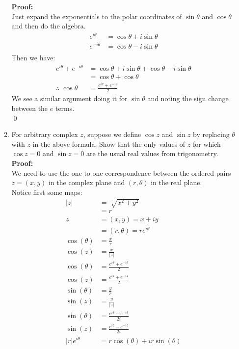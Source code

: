 \begin{enumerate}
\begin{enumerate}
		\textbf{Proof:} \\
		Just expand the exponentials to the polar coordinates of $\sin\theta$ and $\cos\theta$ and then do the algebra. \\
		\begin{align*}
			e^{i\theta} &= \cos\theta + i\sin\theta \\
			e^{-i\theta} &= \cos\theta - i\sin\theta \\
		\end{align*}
		Then we have:
		\begin{align*}
			e^{i\theta} + e^{-i\theta} &= \cos\theta + i\sin\theta + \cos\theta - i\sin\theta \\
			&= \cos\theta + \cos\theta \\
			\therefore \; \cos\theta &=  \frac{e^{i\theta} + e^{-i\theta}}{2}
		\end{align*}
		We see a similar argument doing it for $\sin\theta$ and noting the sign change between the $e$ terms. \\
		\qed
	

		\item For arbitrary complex $z$, suppose we define $\cos{z}$ and $\sin{z}$ by replacing $\theta$ with $z$ in the above formula. 
		Show that the only values of $z$ for which $\cos{z} = 0$ and $\sin{z} = 0$ are the usual real values from trigonometry. \\
		
		\textbf{Proof:} \\
		We need to use the one-to-one correspondence between the ordered pairs $z = (x, y)$ in the complex plane and $(r, \theta)$ in the real plane.\\

		Notice first some maps:
		\begin{align*}
			|z| &= \sqrt[]{x^2 + y^2} \\
			&= r \\
			z &= (x, y) = x + iy \\
			&= (r, \theta) = re^{i \theta} \\
			\cos(\theta) &= \frac{x}{r} \\
			\cos(z) &= \frac{x}{|z|} \\
			\cos(\theta) &= \frac{e^{i\theta} + e^{-i\theta}}{2} \\
			\cos(z) &= \frac{e^{iz} + e^{-iz}}{2} \\
			\sin(\theta) &= \frac{y}{r} \\
			\sin(z) &= \frac{y}{|z|} \\
			\sin(\theta) &= {\frac{e^{i\theta} - e^{-i\theta}}{2i}} \\
			\sin(z) &= {\frac{e^{iz} - e^{-iz}}{2i}} \\
			|r|e^{i \theta} &= r\cos(\theta) + ir\sin(\theta) \\
		\end{align*}


\end{enumerate}
\end{enumerate}

